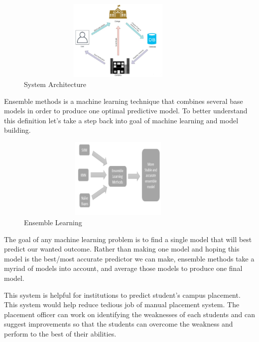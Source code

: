 \documentclass[12pt]{article}
\begin{document}
\begin{figure}[H]
\begin{center}
 \includegraphics[width=10cm, height=3.9cm]{L1P1}
\caption{System Architecture}
\end{center}
\end{figure}

Ensemble methods is a machine learning 
technique that combines several base models in order to 
produce one optimal predictive model. To better understand 
this definition let’s take a step back into goal of machine 
learning and model building.

\begin{figure}[H]
\begin{center}
 \includegraphics[width=10cm, height=3.9cm]{L1P2}
\caption{Ensemble Learning}
\end{center}
\end{figure}

The goal of any machine learning problem is to find a 
single model that will best predict our wanted outcome. Rather 
than making one model and hoping this model is the best/most 
accurate predictor we can make, ensemble methods take a 
myriad of models into account, and average those models to 
produce one final model.

This system is helpful for institutions to predict
student’s campus placement. This system would help reduce 
tedious job of manual placement system. The placement 
officer can work on identifying the weaknesses of each 
students and can suggest improvements so that the students 
can overcome the weakness and perform to the best of their 
abilities.

\newpage
\end{document}
